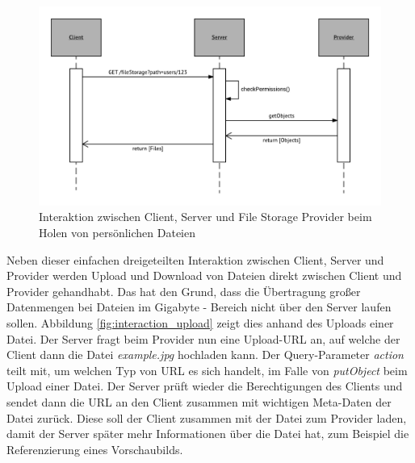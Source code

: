 \begin{figure}[H]
	\centering
	\includegraphics[width=1\linewidth]{images/fileumlsequence}
	\caption[Caption for concept]{Interaktion zwischen Client, Server und File Storage Provider  beim Holen von persönlichen Dateien}
	\label{fig:interacton_getFiles}
\end{figure}

Neben dieser einfachen dreigeteilten Interaktion zwischen Client, Server und Provider werden Upload und Download von Dateien direkt zwischen Client und Provider gehandhabt. Das hat den Grund, dass die Übertragung großer Datenmengen bei Dateien im Gigabyte - Bereich nicht über den Server laufen sollen. Abbildung \ref{fig:interaction_upload} zeigt dies anhand des Uploads einer Datei. Der Server fragt beim Provider nun eine Upload-URL an, auf welche der Client dann die Datei \textit{example.jpg} hochladen kann. Der Query-Parameter \textit{action} teilt mit, um welchen Typ von URL es sich handelt, im Falle von \textit{putObject} beim Upload einer Datei. Der Server prüft wieder die Berechtigungen des Clients und sendet dann die URL an den Client zusammen mit wichtigen Meta-Daten der Datei zurück. Diese soll der Client zusammen mit der Datei zum Provider laden, damit der Server später mehr Informationen über die Datei hat, zum Beispiel die Referenzierung eines Vorschaubilds.

